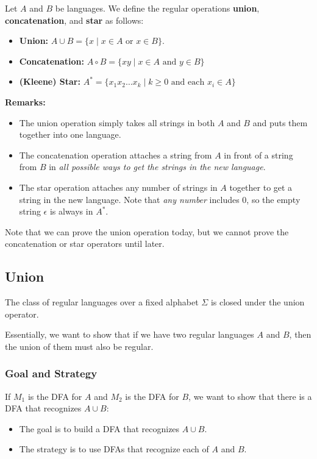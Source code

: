 \documentclass[letterpaper]{article}
\begin{document}
\begin{definition}{}{}
    Let $A$ and $B$ be languages. We define the regular operations \textbf{union}, \textbf{concatenation}, and \textbf{star} as follows: 
    \begin{itemize}
        \item \textbf{Union:} $A \cup B = \{x \mid x \in A \text{ or } x \in B\}$.
        \item \textbf{Concatenation:} $A \circ B = \{xy \mid x \in A \text{ and } y \in B\}$
        \item \textbf{(Kleene) Star:} $A^* = \{x_1 x_2 \dots x_k \mid k \geq 0 \text{ and each } x_i \in A\}$
    \end{itemize}
\end{definition}
\textbf{Remarks:}
\begin{itemize}
    \item The union operation simply takes all strings in both $A$ and $B$ and puts them together into one language.
    \item The concatenation operation attaches a string from $A$ in front of a string from $B$ in \emph{all possible ways to get the strings in the new language}.
    \item The star operation attaches any number of strings in $A$ together to get a string in the new language. Note that \emph{any number} includes 0, so the empty string $\epsilon$ is always in $A^*$.
\end{itemize}
Note that we can prove the union operation today, but we cannot prove the concatenation or star operators until later.

\subsection{Union}
\begin{theorem}{}{}
    The class of regular languages over a fixed alphabet $\Sigma$ is closed under the union operator. 
\end{theorem}
Essentially, we want to show that if we have two regular languages $A$ and $B$, then the union of them must also be regular. 

\subsubsection{Goal and Strategy}
If $M_1$ is the DFA for $A$ and $M_2$ is the DFA for $B$, we want to show that there is a DFA that recognizes $A \cup B$:
\begin{itemize}
    \item The goal is to build a DFA that recognizes $A \cup B$. 
    \item The strategy is to use DFAs that recognize each of $A$ and $B$. 
\end{itemize}
\end{document}
